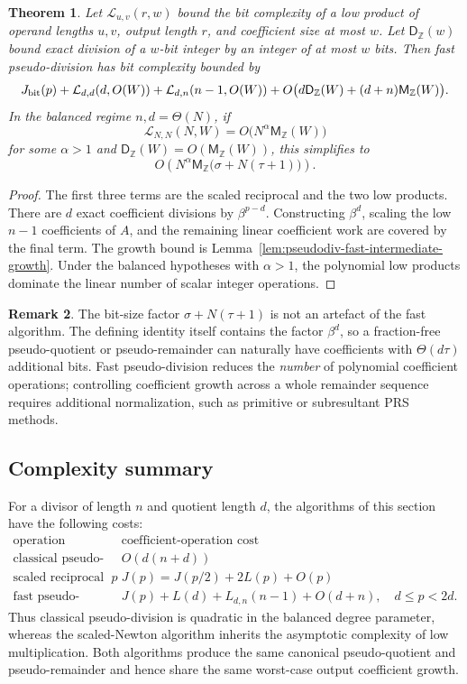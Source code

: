 \documentclass[11pt]{book}
\newtheorem{theorem}{Theorem}[section]
\theoremstyle{definition}
\newtheorem{remark}[theorem]{Remark}
\newcommand{\ZZ}{\mathbb Z}
\newcommand{\MZ}{\mathsf M_{\ZZ}}
\begin{document}
\begin{theorem}\label{thm:pseudodiv-fast-bit-complexity}
Let $\mathcal L_{u,v}(r,w)$ bound the bit complexity of a low product of
operand lengths $u,v$, output length $r$, and coefficient size at most $w$.
Let $\mathsf D_{\ZZ}(w)$ bound exact division of a $w$-bit integer by an
integer of at most $w$ bits.  Then fast pseudo-division has bit complexity
bounded by
\[
 J_{\rm bit}(p)
 +\mathcal L_{d,d}(d,O(W))
 +\mathcal L_{d,n}(n-1,O(W))
 +O\bigl(d\mathsf D_{\ZZ}(W)+(d+n)\MZ(W)\bigr).
\]
In the balanced regime $n,d=\Theta(N)$, if
\[
 \mathcal L_{N,N}(N,W)=O\bigl(N^\alpha\MZ(W)\bigr)
\]
for some $\alpha>1$ and
$\mathsf D_{\ZZ}(W)=O(\MZ(W))$, this simplifies to
\[
 O\!\left(
 N^\alpha\MZ\bigl(\sigma+N(\tau+1)\bigr)
 \right).
\]
\end{theorem}

\begin{proof}
The first three terms are the scaled reciprocal and the two low products.
There are $d$ exact coefficient divisions by $\beta^{p-d}$.  Constructing
$\beta^d$, scaling the low $n-1$ coefficients of $A$, and the remaining
linear coefficient work are covered by the final term.  The growth bound is
Lemma~\ref{lem:pseudodiv-fast-intermediate-growth}.  Under the balanced
hypotheses with $\alpha>1$, the polynomial low products dominate the linear
number of scalar integer operations.
\end{proof}

\begin{remark}
The bit-size factor
$\sigma+N(\tau+1)$ is not an artefact of the fast algorithm.  The defining
identity itself contains the factor $\beta^d$, so a fraction-free
pseudo-quotient or pseudo-remainder can naturally have coefficients with
$\Theta(d\tau)$ additional bits.  Fast pseudo-division reduces the
\emph{number} of polynomial coefficient operations; controlling coefficient
growth across a whole remainder sequence requires additional normalization,
such as primitive or subresultant PRS methods.
\end{remark}

\subsection{Complexity summary}

For a divisor of length $n$ and quotient length $d$, the algorithms of this
section have the following costs:
\[
\begin{array}{c|c}
\text{operation} & \text{coefficient-operation cost}\\
\hline
\text{classical pseudo-division} & O(d(n+d))\\
\text{scaled reciprocal to precision }p &
 J(p)=J(p/2)+2L(p)+O(p)\\
\text{fast pseudo-division} &
 J(p)+L(d)+L_{d,n}(n-1)+O(d+n),\quad d\le p<2d.
\end{array}
\]
Thus classical pseudo-division is quadratic in the balanced degree parameter,
whereas the scaled-Newton algorithm inherits the asymptotic complexity of low
multiplication.  Both algorithms produce the same canonical pseudo-quotient
and pseudo-remainder and hence share the same worst-case output coefficient
growth.
\end{document}
